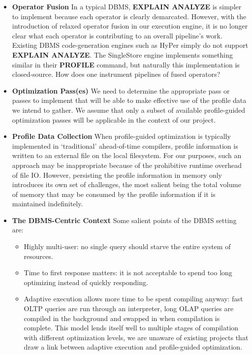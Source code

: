 \documentclass{vldb}
\newcommand{\dbCode}[1]{{\sffamily\small \textbf{#1}}\xspace}
\begin{document}
\begin{itemize}
    \item \textbf{Operator Fusion} In a typical DBMS, \dbCode{EXPLAIN ANALYZE} is simpler to implement because each operator is clearly demarcated. However, with the introduction of relaxed operator fusion in our execution engine, it is no longer clear what each operator is contributing to an overall pipeline’s work. Existing DBMS code-generation engines such as HyPer simply do not support \dbCode{EXPLAIN ANALYZE}. The SingleStore engine implements something similar in their \dbCode{PROFILE} command, but naturally this implementation is closed-source. How does one instrument pipelines of fused operators?
    \item \textbf{Optimization Pass(es)} We need to determine the appropriate pass or passes to implement that will be able to make effective use of the profile data we intend to gather. We assume that only a subset of available profile-guided optimization passes will be applicable in the context of our project.
    \item \textbf{Profile Data Collection} When profile-guided optimization is typically implemented in `traditional' ahead-of-time compilers, profile information is written to an external file on the local filesystem. For our purposes, such an approach may be inappropriate because of the prohibitive runtime overhead of file IO. However, persisting the profile information in memory only introduces its own set of challenges, the most salient being the total volume of memory that may be consumed by the profile information if it is maintained indefinitely.
    \item \textbf{The DBMS-Centric Context} Some salient points of the DBMS setting are:
    \begin{itemize}
        \item Highly multi-user: no single query should starve the entire system of resources.
        \item Time to first response matters: it is not acceptable to spend too long optimizing instead of quickly responding.
        \item Adaptive execution allows more time to be spent compiling anyway: fast OLTP queries are run through an interpreter, long OLAP queries are compiled in the background and swapped in when compilation is complete. This model lends itself well to multiple stages of compilation with different optimization levels, we are unaware of existing projects that draw a link between adaptive execution and profile-guided optimization.
    \end{itemize}
\end{itemize}
\end{document}
